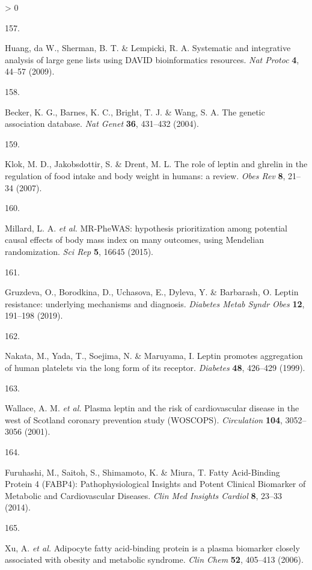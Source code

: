 \documentclass[11pt,twoside]{bristolthesis}
\newlength{\cslhangindent}
\newlength{\csllabelwidth}
\newenvironment{CSLReferences}[2] %
 {%
  \setlength{\parindent}{0pt}
  \ifodd #1 \everypar{\setlength{\hangindent}{\cslhangindent}}\ignorespaces\fi
  \ifnum #2 > 0
  \setlength{\parskip}{#2\baselineskip}
  \fi
 }%
 {}
\newcommand{\CSLLeftMargin}[1]{\parbox[t]{\csllabelwidth}{#1}}
\newcommand{\CSLRightInline}[1]{\parbox[t]{\linewidth - \csllabelwidth}{#1}\break}
\begin{document}
\begin{CSLReferences}{0}{0}
\leavevmode\hypertarget{ref-Huang2009}{}%
\CSLLeftMargin{157. }
\CSLRightInline{Huang, da W., Sherman, B. T. \& Lempicki, R. A. {Systematic and integrative analysis of large gene lists using DAVID bioinformatics resources}. \emph{Nat Protoc} \textbf{4}, 44--57 (2009).}

\leavevmode\hypertarget{ref-Becker2004a}{}%
\CSLLeftMargin{158. }
\CSLRightInline{Becker, K. G., Barnes, K. C., Bright, T. J. \& Wang, S. A. {The genetic association database}. \emph{Nat Genet} \textbf{36}, 431--432 (2004).}

\leavevmode\hypertarget{ref-Klok2007}{}%
\CSLLeftMargin{159. }
\CSLRightInline{Klok, M. D., Jakobsdottir, S. \& Drent, M. L. {The role of leptin and ghrelin in the regulation of food intake and body weight in humans: a review}. \emph{Obes Rev} \textbf{8}, 21--34 (2007).}

\leavevmode\hypertarget{ref-Millard2015}{}%
\CSLLeftMargin{160. }
\CSLRightInline{Millard, L. A. \emph{et al.} {MR-PheWAS: hypothesis prioritization among potential causal effects of body mass index on many outcomes, using Mendelian randomization}. \emph{Sci Rep} \textbf{5}, 16645 (2015).}

\leavevmode\hypertarget{ref-Gruzdeva2019a}{}%
\CSLLeftMargin{161. }
\CSLRightInline{Gruzdeva, O., Borodkina, D., Uchasova, E., Dyleva, Y. \& Barbarash, O. {Leptin resistance: underlying mechanisms and diagnosis}. \emph{Diabetes Metab Syndr Obes} \textbf{12}, 191--198 (2019).}

\leavevmode\hypertarget{ref-Nakata1999}{}%
\CSLLeftMargin{162. }
\CSLRightInline{Nakata, M., Yada, T., Soejima, N. \& Maruyama, I. {Leptin promotes aggregation of human platelets via the long form of its receptor}. \emph{Diabetes} \textbf{48}, 426--429 (1999).}

\leavevmode\hypertarget{ref-Wallace2001}{}%
\CSLLeftMargin{163. }
\CSLRightInline{Wallace, A. M. \emph{et al.} {Plasma leptin and the risk of cardiovascular disease in the west of Scotland coronary prevention study (WOSCOPS)}. \emph{Circulation} \textbf{104}, 3052--3056 (2001).}

\leavevmode\hypertarget{ref-Furuhashi2014}{}%
\CSLLeftMargin{164. }
\CSLRightInline{Furuhashi, M., Saitoh, S., Shimamoto, K. \& Miura, T. {Fatty Acid-Binding Protein 4 (FABP4): Pathophysiological Insights and Potent Clinical Biomarker of Metabolic and Cardiovascular Diseases}. \emph{Clin Med Insights Cardiol} \textbf{8}, 23--33 (2014).}

\leavevmode\hypertarget{ref-Xu2006}{}%
\CSLLeftMargin{165. }
\CSLRightInline{Xu, A. \emph{et al.} {Adipocyte fatty acid-binding protein is a plasma biomarker closely associated with obesity and metabolic syndrome}. \emph{Clin Chem} \textbf{52}, 405--413 (2006).}


\end{CSLReferences}
\end{document}
